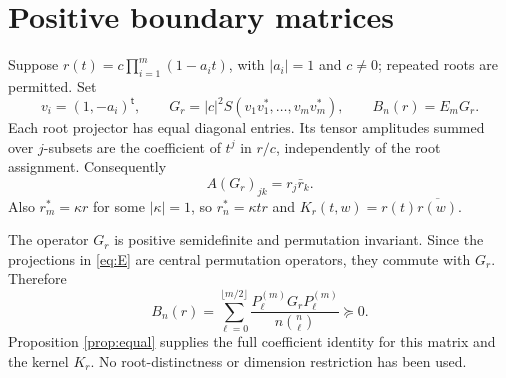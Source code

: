 \documentclass[11pt,a4paper]{article}
\theoremstyle{remark}\newtheorem{remark}[theorem]{Remark}
\newcommand{\bin}[2]{\binom{#1}{#2}}
\begin{document}
\section{Positive boundary matrices}
Suppose
$r(t)=c\prod_{i=1}^m(1-a_it)$, with $|a_i|=1$ and $c\neq0$; repeated roots are permitted. Set
\begin{equation}\label{eq:rootG}
 v_i=(1,-a_i)^{\mathsf t},\qquad
 G_r=|c|^2S(v_1v_1^*,\ldots,v_mv_m^*),\qquad B_n(r)=E_mG_r.
\end{equation}
Each root projector has equal diagonal entries. Its tensor amplitudes summed over $j$-subsets are the coefficient of $t^j$ in $r/c$, independently of the root assignment. Consequently
\begin{equation}\label{eq:compress}
 A(G_r)_{jk}=r_j\bar r_k.
\end{equation}
Also $r_m^*=\kappa r$ for some $|\kappa|=1$, so $r_n^*=\kappa tr$ and $K_r(t,w)=r(t)\overline{r(w)}$.

The operator $G_r$ is positive semidefinite and permutation invariant. Since the projections in \eqref{eq:E} are central permutation operators, they commute with $G_r$. Therefore
\begin{equation}\label{eq:positive}
 B_n(r)=\sum_{\ell=0}^{\lfloor m/2\rfloor}
              \frac{P_\ell^{(m)}G_rP_\ell^{(m)}}{n\bin n\ell}\succeq0.
\end{equation}
Proposition \ref{prop:equal} supplies the full coefficient identity for this matrix and the kernel $K_r$. No root-distinctness or dimension restriction has been used.
\end{document}

